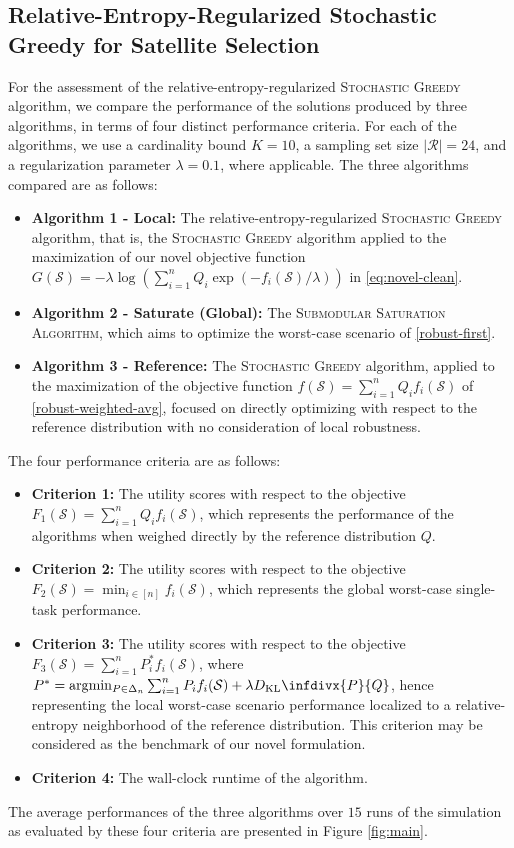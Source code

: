 \documentclass[letter,11pt]{article}
\newcommand{\argmin}{\arg\!\min}
\newcommand{\infdiv}{D_{\text{KL}}\infdivx}
\def\sS{\mathcal{S}}
\begin{document}
\subsection{Relative-Entropy-Regularized Stochastic Greedy for Satellite Selection}\label{subsec:satsel}
For the assessment of the relative-entropy-regularized \textsc{Stochastic Greedy} algorithm, we compare the performance of the solutions produced by three algorithms, in terms of four distinct performance criteria. For each of the algorithms, we use a cardinality bound $K=10$, a sampling set size $\lvert\mathcal{R}\rvert=24$, and a regularization parameter $\lambda=0.1$, where applicable. The three algorithms compared are as follows:
\begin{itemize}
    \item \textbf{Algorithm 1 - Local:} The relative-entropy-regularized \textsc{Stochastic Greedy} algorithm, that is, the \textsc{Stochastic Greedy} algorithm applied to the maximization of our novel objective function $G(\sS) = -\lambda\log(\sum_{i=1}^nQ_i\exp{(-f_i(\sS)/\lambda)})$ in  \eqref{eq:novel-clean}.
    \item \textbf{Algorithm 2 - Saturate (Global):} The \textsc{Submodular Saturation Algorithm}, which aims to optimize the worst-case scenario of \eqref{robust-first}.
    \item \textbf{Algorithm 3 - Reference:} The \textsc{Stochastic Greedy} algorithm, applied to the maximization of the objective function $f(\sS) =\sum_{i=1}^nQ_if_i(\sS)$ of \eqref{robust-weighted-avg}, focused on directly optimizing with respect to the reference distribution with no consideration of local robustness.
\end{itemize}
The four performance criteria are as follows:
\begin{itemize}
    \item \textbf{Criterion 1:} The utility scores with respect to the objective $F_1(\sS) = \sum_{i=1}^n Q_i f_i(\sS)$, which represents the performance of the algorithms when weighed directly by the reference distribution $Q$.
    \item \textbf{Criterion 2:} The utility scores with respect to the objective $F_2(\sS) = \min_{i\in[n]} f_i(\sS)$, which represents the global worst-case single-task performance.
    \item \textbf{Criterion 3:} The utility scores with respect to the objective $F_3(\sS) = \sum_{i=1}^n P^*_i f_i(\sS)$, where $P^* = \argmin_{P\in\Delta_n} \sum^n_{i=1} P_i f_i(\sS) + \lambda \infdiv{P}{Q}$, hence representing the local worst-case scenario performance localized to a relative-entropy neighborhood of the reference distribution. This criterion may be considered as the benchmark of our novel formulation.
    \item \textbf{Criterion 4:} The wall-clock runtime of the algorithm.
\end{itemize}
The average performances of the three algorithms over $15$ runs of the simulation as evaluated by these four criteria are presented in Figure \ref{fig:main}.
\end{document}
